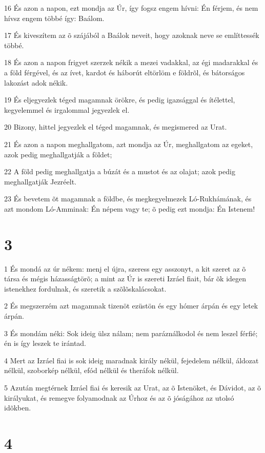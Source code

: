 \par 16 És azon a napon, ezt mondja az Úr, így fogsz engem hívni: Én férjem, és nem hívsz engem többé így: Baálom.
\par 17 És kiveszítem az õ szájából a Baálok neveit, hogy azoknak neve se említtessék többé.
\par 18 És azon a napon frigyet szerzek nékik a mezei vadakkal, az égi madarakkal és a föld férgével, és az ívet, kardot és háborút eltörlöm e földrõl, és bátorságos lakozást adok nékik.
\par 19 És eljegyezlek téged magamnak örökre, és pedig igazsággal és ítélettel, kegyelemmel és irgalommal jegyezlek el.
\par 20 Bizony, hittel jegyezlek el téged magamnak, és megismered az Urat.
\par 21 És azon a napon meghallgatom, azt mondja az Úr, meghallgatom az egeket, azok pedig meghallgatják a földet;
\par 22 A föld pedig meghallgatja a búzát és a mustot és az olajat; azok pedig meghallgatják Jezréelt.
\par 23 És bevetem õt magamnak a földbe, és megkegyelmezek Ló-Rukhámának, és azt mondom Ló-Amminak: Én népem vagy te; õ pedig ezt mondja: Én Istenem!

\chapter{3}

\par 1 És mondá az úr nékem: menj el újra, szeress egy asszonyt, a kit szeret az õ társa és mégis házasságtörõ; a mint az Úr is szereti Izráel fiait,  bár õk idegen istenekhez fordulnak, és szeretik a szõlõskalácsokat.
\par 2 És megszerzém azt magamnak tizenöt ezüstön és egy hómer árpán és egy letek árpán.
\par 3 És mondám néki: Sok ideig ülsz nálam; nem paráználkodol és nem leszel férfié; én is így leszek te irántad.
\par 4 Mert az Izráel fiai is sok ideig maradnak király nékül, fejedelem nélkül, áldozat nélkül, szoborkép nélkül, efód nélkül és theráfok nélkül.
\par 5 Azután megtérnek Izráel fiai és keresik az Urat, az õ Istenöket, és Dávidot, az õ királyukat,  és remegve folyamodnak az Úrhoz és az õ jóságához az utolsó idõkben.

\chapter{4}

